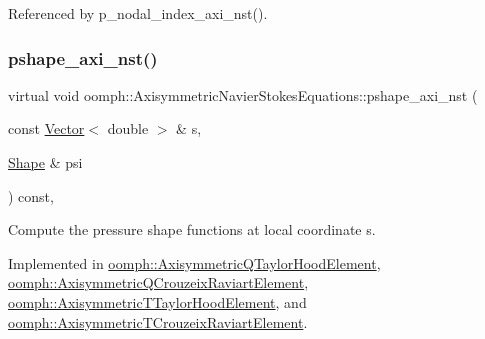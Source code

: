 Referenced by p\+\_\+nodal\+\_\+index\+\_\+axi\+\_\+nst().

\mbox{\label{classoomph_1_1AxisymmetricNavierStokesEquations_a6309780fd1964c4df0cca0818ccff158}} 
\subsubsection{\texorpdfstring{pshape\+\_\+axi\+\_\+nst()}{pshape\_axi\_nst()}\hspace{0.1cm}{\footnotesize\ttfamily [1/2]}}
{\footnotesize\ttfamily virtual void oomph\+::\+Axisymmetric\+Navier\+Stokes\+Equations\+::pshape\+\_\+axi\+\_\+nst (\begin{DoxyParamCaption}\item[{const \hyperlink{classoomph_1_1Vector}{Vector}$<$ double $>$ \&}]{s,  }\item[{\hyperlink{classoomph_1_1Shape}{Shape} \&}]{psi }\end{DoxyParamCaption}) const\hspace{0.3cm}{\ttfamily [protected]}, {}}



Compute the pressure shape functions at local coordinate s. 



Implemented in \hyperlink{classoomph_1_1AxisymmetricQTaylorHoodElement_ab4eea01cdcd97616ce75e6547c0c4338}{oomph\+::\+Axisymmetric\+Q\+Taylor\+Hood\+Element}, \hyperlink{classoomph_1_1AxisymmetricQCrouzeixRaviartElement_a6a16bdbe2fc4e1bfe09123c50d101688}{oomph\+::\+Axisymmetric\+Q\+Crouzeix\+Raviart\+Element}, \hyperlink{classoomph_1_1AxisymmetricTTaylorHoodElement_a9a52e3c13681e0ad373b330a0934b7a1}{oomph\+::\+Axisymmetric\+T\+Taylor\+Hood\+Element}, and \hyperlink{classoomph_1_1AxisymmetricTCrouzeixRaviartElement_afd3664b820b924b9509f4f75eaf7420c}{oomph\+::\+Axisymmetric\+T\+Crouzeix\+Raviart\+Element}.



